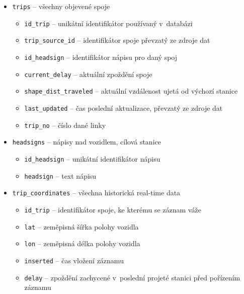 \begin{itemize}
\item \verb-trips- -- všechny objevené spoje


\begin{itemize}
\item \verb-id_trip- -- unikátní identifikátor používaný v~databázi


\item \verb-trip_source_id- -- identifikátor spoje převzatý ze zdroje dat


\item \verb-id_headsign- -- identifikátor nápisu pro daný spoj


\item \verb-current_delay- -- aktuální zpoždění spoje


\item \verb-shape_dist_traveled- -- aktuální vzdálenost ujetá od výchozí stanice


\item \verb-last_updated- -- čas poslední aktualizace, převzatý ze zdroje dat


\item \verb-trip_no- -- číslo dané linky
\end{itemize}


\item \verb-headsigns- -- nápisy nad vozidlem, cílová stanice


\begin{itemize}
\item \verb-id_headsign- -- unikátní identifikátor nápisu


\item \verb-headsign- -- text nápisu
\end{itemize}


\item \verb-trip_coordinates- -- všechna historická real-time data


\begin{itemize}
\item \verb-id_trip- -- identifikátor spoje, ke kterému se záznam váže


\item \verb-lat- -- zeměpisná šířka polohy vozidla


\item \verb-lon- -- zeměpisná délka polohy vozidla


\item \verb-inserted- -- čas vložení záznamu


\item \verb-delay- -- zpoždění zachycené v~poslední projeté stanici před pořízením záznamu



\end{itemize}
\end{itemize}

